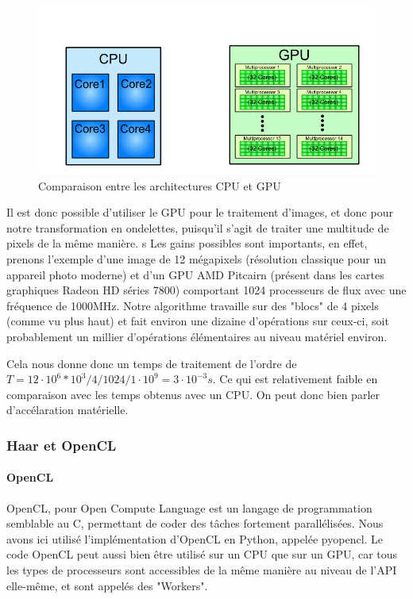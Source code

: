 \begin{figure}[!h]
\centering
\includegraphics{images/cpugpu.png}
\caption{Comparaison entre les architectures CPU et GPU}
\label{cpugpu}
\end{figure}


Il est donc possible d'utiliser le GPU pour le traitement d'images, et donc pour notre transformation en ondelettes, puisqu'il s'agit de traiter une multitude de pixels de la même manière.
s
Les gains possibles sont importants, en effet, prenons l'exemple d'une image de 12 mégapixels (résolution classique pour un appareil photo moderne) et d'un GPU AMD Pitcairn (présent dans les cartes graphiques Radeon HD séries 7800) comportant 1024 processeurs de flux avec une fréquence de 1000MHz. Notre algorithme travaille sur des "blocs" de 4 pixels (comme vu plus haut) et fait environ une dizaine d'opérations sur ceux-ci, soit probablement un millier d'opérations élémentaires au niveau matériel environ.

Cela nous donne donc un temps de traitement de l'ordre de $T = 12\cdot{}10^6 * 10^3 / 4 / 1024 / 1\cdot{}10^9 = 3\cdot{}10^{-3} s$. Ce qui est relativement faible en comparaison avec les temps obtenus avec un CPU. On peut donc bien parler d'accélaration matérielle.

\subsubsection{Haar et OpenCL}

\paragraph{OpenCL}

OpenCL, pour Open Compute Language est un langage de programmation semblable au C, permettant de coder des tâches fortement parallélisées. Nous avons ici utilisé l'implémentation d'OpenCL en Python, appelée pyopencl. Le code OpenCL peut aussi bien être utilisé sur un CPU que sur un GPU, car tous les types de processeurs sont accessibles de la même manière au niveau de l'API elle-même, et sont appelés des "Workers".

